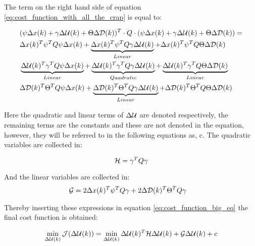 The term on the right hand side of equation \ref{eq:cost_function_with_all_the_crap} is equal to:

\begin{equation}\label{eq:cost_function_big_eq}
	\begin{aligned}
	&(\psi\Delta x(k) + \gamma\Delta \CMcal{U}(k) + \Theta\Delta \CMcal{D}(k))^T\cdot Q \cdot (\psi\Delta x(k) + \gamma\Delta \CMcal{U}(k) + \Theta\Delta \CMcal{D}(k)) = \\
	& \Delta x(k)^T\psi ^T Q \psi \Delta x(k) 								+ \underbrace{\Delta x(k)^T \psi ^T Q \gamma \Delta  \CMcal{U}(k) }_{Linear}				+\Delta x(k)^T \psi ^T Q \Theta \Delta \CMcal{D}(k) \\
	& \underbrace{\Delta \CMcal{U}(k)^T \gamma ^T Q \psi\Delta x(k)}_{Linear} + \underbrace{\Delta \CMcal{U}(k)^T\gamma ^T Q \gamma\Delta \CMcal{U}(k)}_{Quadratic} +\underbrace{\Delta \CMcal{U}(k)^T \gamma ^T Q\Theta \Delta \CMcal{D}(k)}_{Linear} \\ 
	& \Delta \CMcal{D}(k)^T \Theta ^T Q  \psi \Delta x(k)					+ \underbrace{\Delta \CMcal{D}(k)^T \Theta ^T Q \gamma  \Delta \CMcal{U}(k) }_{Linear}	+\Delta \CMcal{D}(k)^T \Theta ^T Q \Theta \Delta \CMcal{D}(k)
	\end{aligned}
\end{equation}

Here the quadratic and linear terms of $\Delta \CMcal{U}$ are denoted respectively, the remaining terms are the constants and these are not denoted in the equation, however, they will be referred to in the following equations as, c. The quadratic variables are collected in: 

\begin{equation}
	\CMcal{H} = \gamma^T Q\gamma 
\end{equation}

And the linear variables are collected in:
\begin{equation}
	\begin{aligned}
	\CMcal{G} &= 2 \Delta x(k)^T\psi^T Q \gamma+2 \Delta \CMcal{D}(k)^T\Theta^T Q \gamma 
	\end{aligned}
\end{equation}

Thereby inserting these expressions in equation \ref{eq:cost_function_big_eq} the final cost function is obtained:

\begin{equation}\label{eq:the_cost_function}
	\min_{\Delta \CMcal{U}(k)} \CMcal{J}(\Delta \CMcal{U}(k)) =\min_{\Delta \CMcal{U}(k)} \Delta \CMcal{U}(k)^T\CMcal{H}\Delta \CMcal{U}(k)+\CMcal{G}\Delta \CMcal{U}(k)+c
\end{equation}

